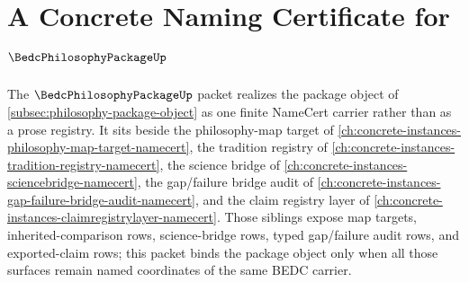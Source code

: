 \chapter{A Concrete Naming Certificate for $\BedcPhilosophyPackageUp$}
\label{ch:concrete-instances-bedc-philosophy-package-namecert}

The $\BedcPhilosophyPackageUp$ packet realizes the package object of \autoref{subsec:philosophy-package-object} as one finite NameCert carrier rather than as a prose registry. It sits beside the philosophy-map target of \autoref{ch:concrete-instances-philosophy-map-target-namecert}, the tradition registry of \autoref{ch:concrete-instances-tradition-registry-namecert}, the science bridge of \autoref{ch:concrete-instances-sciencebridge-namecert}, the gap/failure bridge audit of \autoref{ch:concrete-instances-gap-failure-bridge-audit-namecert}, and the claim registry layer of \autoref{ch:concrete-instances-claimregistrylayer-namecert}. Those siblings expose map targets, inherited-comparison rows, science-bridge rows, typed gap/failure audit rows, and exported-claim rows; this packet binds the package object only when all those surfaces remain named coordinates of the same BEDC carrier.

